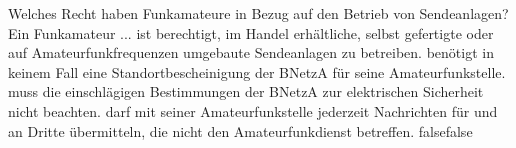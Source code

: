     {Welches Recht haben Funkamateure in Bezug auf den Betrieb von Sendeanlagen? Ein Funkamateur ...}
    {ist berechtigt, im Handel erhältliche, selbst gefertigte oder auf Amateurfunkfrequenzen umgebaute Sendeanlagen zu betreiben.}
    {benötigt in keinem Fall eine Standortbescheinigung der BNetzA für seine Amateurfunkstelle.}
    {muss die einschlägigen Bestimmungen der BNetzA zur elektrischen Sicherheit nicht beachten.}
    {darf mit seiner Amateurfunkstelle jederzeit Nachrichten für und an Dritte übermitteln, die nicht den Amateurfunkdienst betreffen.}
    {false}{false}